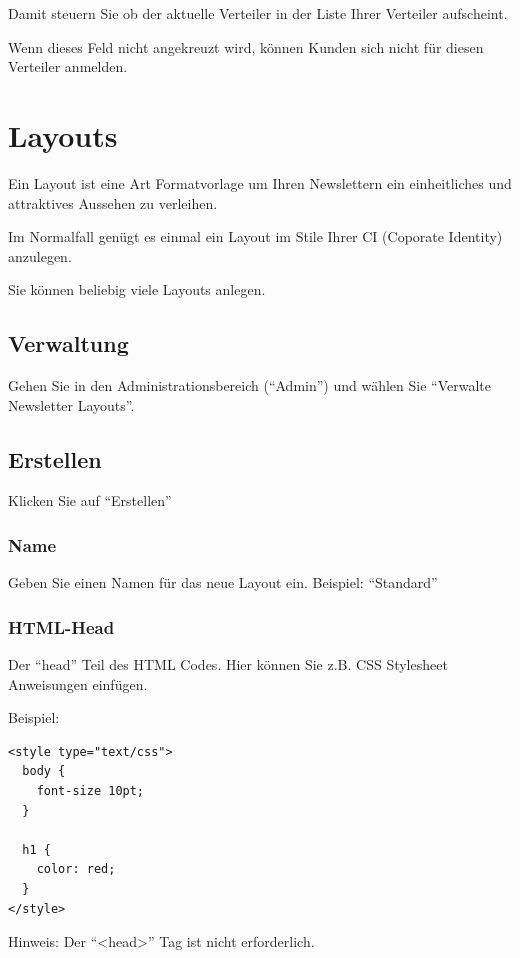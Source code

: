 \documentclass[article, a4paper, oneside, 11pt]{memoir}
\begin{document}
Damit steuern Sie ob der aktuelle Verteiler in der Liste Ihrer Verteiler aufscheint.

Wenn dieses Feld nicht angekreuzt wird, können Kunden sich nicht für diesen Verteiler anmelden.


\chapter{Layouts}

Ein Layout ist eine Art Formatvorlage um Ihren Newslettern ein einheitliches und attraktives Aussehen zu verleihen.

Im Normalfall genügt es einmal ein Layout im Stile Ihrer CI (Coporate Identity) anzulegen.

Sie können beliebig viele Layouts anlegen.


\section{Verwaltung}

Gehen Sie in den Administrationsbereich ("`Admin"') und wählen Sie "`Verwalte Newsletter Layouts"'.

\section{Erstellen}
\label{sec:create-layout}

Klicken Sie auf "`Erstellen"'

\subsection{Name}

Geben Sie einen Namen für das neue Layout ein. Beispiel: "`Standard"'

\subsection{HTML-Head}

Der "`head"' Teil des HTML Codes. Hier können Sie z.B. CSS Stylesheet Anweisungen einfügen.

Beispiel:

\begin{lstlisting}
<style type="text/css">
  body {
    font-size 10pt; 
  }
  
  h1 { 
    color: red;
  } 
</style>
\end{lstlisting}

Hinweis: Der "`<head>"' Tag ist nicht erforderlich.
\end{document}
